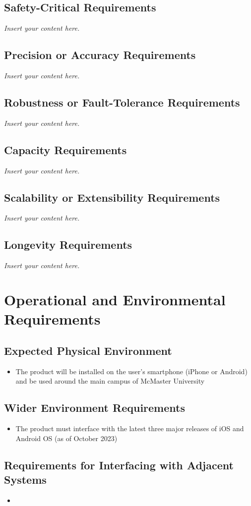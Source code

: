 \documentclass[12pt]{article}
\newcommand{\lips}{\textit{Insert your content here.}}
\begin{document}
\subsection{Safety-Critical Requirements}
\lips
\subsection{Precision or Accuracy Requirements}
\lips
\subsection{Robustness or Fault-Tolerance Requirements}
\lips
\subsection{Capacity Requirements}
\lips
\subsection{Scalability or Extensibility Requirements}
\lips
\subsection{Longevity Requirements}
\lips

\section{Operational and Environmental Requirements}
\subsection{Expected Physical Environment}
\begin{itemize}
  \item The product will be installed on the user's smartphone (iPhone or Android) and be used around the main campus of McMaster University
\end{itemize}

\subsection{Wider Environment Requirements}
\begin{itemize}
  \item The product must interface with the latest three major releases of iOS and Android OS (as of October 2023)
\end{itemize}

\subsection{Requirements for Interfacing with Adjacent Systems}
\begin{itemize}
  \item
\end{itemize}
\end{document}
